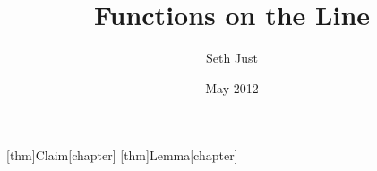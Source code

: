 \documentclass[12pt]{reedthesis} %
\title{Functions on the Line}
\author{Seth Just}
\date{May 2012}
\theoremstyle{plain}
\theoremstyle{definition}
\begin{document}
[thm]{Claim}[chapter]
[thm]{Lemma}[chapter]

  \maketitle
  \frontmatter
  \pagestyle{empty} %

  

  \tableofcontents

  \onehalfspacing
  

  \mainmatter
  \pagestyle{fancyplain} %

  
  
  
  
%  

  \appendix

  \backmatter
  \singlespacing
  \raggedright

  \ifdraft{\nocite{*}}{}

   
  
\end{document}
